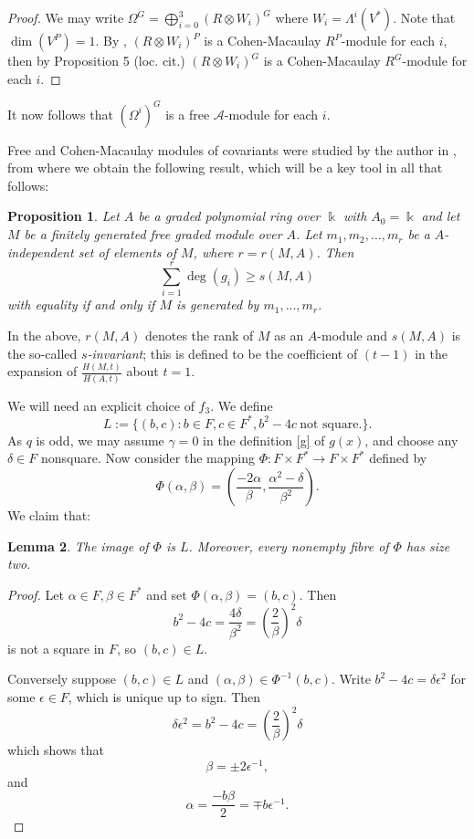 \documentclass[a4paper]{amsart}
\newcommand{\kk}{\Bbbk}
\newtheorem{Lemma}{Lemma}[section]
\newtheorem{prop}[Lemma]{Proposition}
\newtheorem*{Corollary of Conjecture}{Corollary of Conjecture}
\theoremstyle{definition}
\theoremstyle{remark}
\theoremstyle{Acknowledgments}
\begin{document}
\begin{proof} We may write $\Omega^G = \bigoplus_{i=0}^3 (R \otimes W_i)^G$ where $W_i = \Lambda^i(V^*)$. Note that $\dim(V^P) =1$. By \cite[Proposition~6(ii)]{BroerChuaiRelative}, $(R \otimes W_i)^P$ is a Cohen-Macaulay $R^P$-module for each $i$, then by Proposition 5 (loc. cit.)  
$(R \otimes W_i)^G$ is a Cohen-Macaulay $R^G$-module for each $i$.
\end{proof}

It now follows that $(\Omega^i)^G$ is a free $\mathcal{A}$-module for each $i$. 

Free and Cohen-Macaulay modules of covariants were studied by the author in \cite{ElmerCMCov}, from where we obtain the following result, which will be a key tool in all that follows:

\begin{prop}\label{freetest} Let $A$ be a graded polynomial ring over $\kk$ with $A_0= \kk$ and let $M$ be a finitely generated free graded module over $A$. Let $m_1, m_2, \ldots, m_r$ be a $A$-independent set of elements of $M$, where $r = r(M,A)$. Then
\[\sum_{i=1}^r \deg(g_i) \geq s(M,A)\] with equality if and only if $M$ is generated by $m_1, \ldots, m_r$.
\end{prop}

In the above, $r(M,A)$ denotes the rank of $M$ as an $A$-module and $s(M,A)$ is the so-called {\it $s$-invariant}; this is defined to be the coefficient of $(t-1)$ in the expansion of $\frac{H(M,t)}{H(A,t)}$ about $t=1$. 




We will need an explicit choice of $f_3$. We define 
 \begin{equation}\label{L} L:= \{(b,c): b \in F, c \in F^*, b^2-4c \ \text{not square}.\}.\end{equation}
As $q$ is odd, we may assume $\gamma = 0$ in the definition \eqref{g} of $g(x)$, and choose any $\delta \in F$ nonsquare. Now
consider the mapping $\Phi: F \times F^* \rightarrow F \times F^*$ defined by
\[\Phi(\alpha, \beta) = \left(\frac{-2 \alpha}{\beta}, \frac{\alpha^2-\delta}{\beta^2} \right).\]
We claim that:

\begin{Lemma}
The image of $\Phi$ is $L$. Moreover, every nonempty fibre of $\Phi$ has size two.
\end{Lemma}

\begin{proof}
Let $\alpha \in F, \beta \in F^*$ and set $\Phi(\alpha, \beta) = (b,c)$. Then
\[b^2-4c = \frac{4 \delta}{\beta^2} = \left(\frac{2}{\beta}\right)^2 \delta\] is not a square in $F$, so $(b,c) \in L$.

Conversely suppose $(b,c) \in L$ and $(\alpha, \beta) \in \Phi^{-1}(b,c)$. Write $b^2-4c = \delta \epsilon^2$ for some $\epsilon \in F$, which is unique up to sign. Then
\[\delta \epsilon^2 = b^2-4c =  \left(\frac{2}{\beta}\right)^2 \delta\] which shows that
\[\beta = \pm 2 \epsilon^{-1},\]
and \[\alpha =\frac{- b \beta}{2} = \mp b \epsilon^{-1}.\]
\end{proof}
\end{document}
